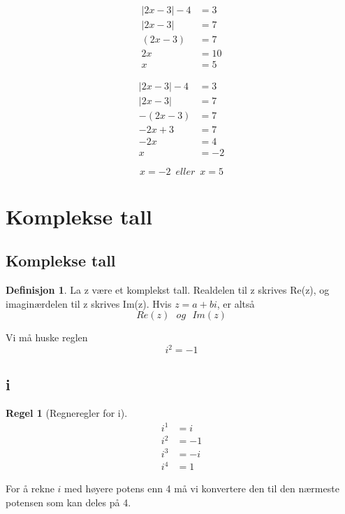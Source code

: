 \documentclass[11pt]{article}
\theoremstyle{definition}
\newtheorem{mindef}{Definisjon}[section]
\newenvironment{fmindef}
{\begin{mdframed}[style=minstil]\begin{mindef}}
		{\end{mindef}\end{mdframed}}
\theoremstyle{definition}
\theoremstyle{definition}
\theoremstyle{definition}
\theoremstyle{definition}
\newtheorem{regel}{Regel}
\newenvironment{fregel}
{\begin{mdframed}[style=minstil]\begin{regel}}
		{\end{regel}\end{mdframed}}
\theoremstyle{definition}
\begin{document}
		\begin{align*}
		|2x-3|-4&=3		\\
		|2x-3|&=7		\\
		(2x-3)&=7		\\
		2x&=10			\\
		x&=5
		\end{align*}
		
		\begin{align*}
		|2x-3|-4&=3		\\
		|2x-3|&=7		\\
		-(2x-3)&=7		\\
		-2x+3&=7		\\
		-2x&=4			\\
		x&=-2				
		\end{align*}
		
		\[x=-2 \,\,\, eller \,\,\, x=5\]
    \newpage 
    \section{Komplekse tall}
	
	\subsection{Komplekse tall}
	
	\begin{fmindef}
		La z være et komplekst tall. Realdelen til z skrives Re(z), og imaginærdelen til z skrives Im(z). Hvis \(z=a+bi\), er altså \[Re(z) \hspace{8pt} og \hspace{8pt} Im(z)\]
	\end{fmindef}
	
	Vi må huske reglen \[i^2=-1\]
	
	\subsection{i}
	
	\begin{fregel}[Regneregler for i]
		\begin{align*}
		i^1&=i \\
		i^2&=-1 \\
		i^3&=-i \\
		i^4&=1
		\end{align*}
	\end{fregel}
	
	For å rekne \(i\) med høyere potens enn 4 må vi konvertere den til den nærmeste potensen som kan deles på 4. 
	
\end{document}
